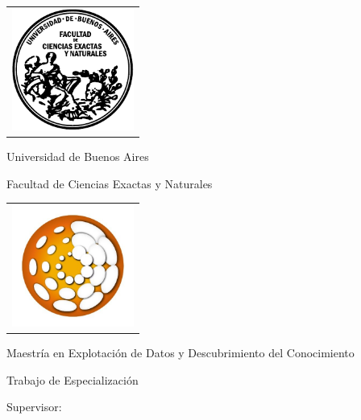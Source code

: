 \newcommand{\HRule}{\rule{\linewidth}{0.2mm}}
%
\thispagestyle{empty}

\begin{center}\leavevmode

\vspace{-2cm}

\begin{tabular}{l}
\includegraphics[width=4cm]{caratula/logofcen.pdf}
\end{tabular}

{\large \sc Universidad de Buenos Aires

Facultad de Ciencias Exactas y Naturales}


\begin{tabular}{l}
\includegraphics[width=4cm]{caratula/logo_UBA_DM.jpeg}
\end{tabular}

{\large \sc Maestría en Explotación de Datos y Descubrimiento del Conocimiento}


\vspace{4.0cm}


\begin{huge}
\textbf{\tituloTesis}
\end{huge}

\vspace{2cm}

{\large Trabajo de Especialización}

\vspace{2cm}

{\Large \autor}

\end{center}

\vfill

{\large


\vspace{.2cm}

{Supervisor: \codirector}

\vspace{.2cm}

\lugar
}

\newpage\thispagestyle{empty}
